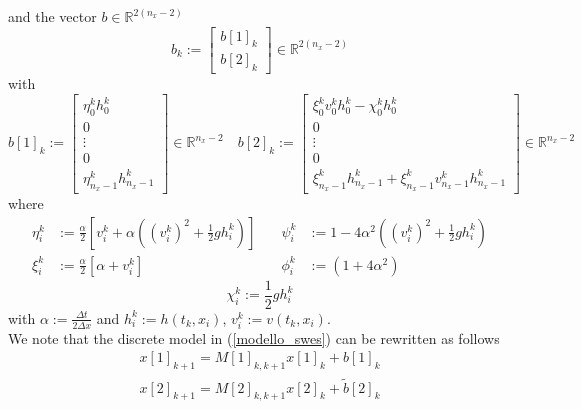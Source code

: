 \documentclass[smallcondensed]{svjour3}
\begin{document}
{and the vector $b\in \mathbb{R}^{2(n_{x}-2)}$
\begin{equation}
b_{k}:=\left[\begin{array}{ll}
b[1]_{k}\\
b[2]_{k}
\end{array}\right]\in \mathbb{R}^{2(n_{x}-2)}
\end{equation}
with 
\begin{equation}\label{b[1]}
b[1]_{k}:=\left[\begin{array}{ll}
\eta_{0}^{k}h_{0}^{k}\\
0\\
\vdots\\
0\\
\eta_{n_{x}-1}^{k}h_{n_{x}-1}^{k}
\end{array}\right]\in \mathbb{R}^{n_{x}-2} \quad 
b[2]_{k}:=\left[\begin{array}{ll}
\xi_{0}^{k}v_{0}^{k}h_{0}^{k}-\chi_{0}^{k}h_{0}^{k}\\
0\\
\vdots
\\
0
\\
\xi_{n_{x}-1}^{k}h_{n_{x}-1}^{k}+\xi_{n_{x}-1}^{k}v_{n_{x}-1}^{k}h_{n_{x}-1}^{k}
\end{array}\right]\in \mathbb{R}^{n_{x}-2} 
\end{equation}
}
\noindent where 
\begin{displaymath}
\begin{array}{lllllll}
\eta_{i}^{k}&:=\frac{\alpha}{2}[v_{i}^{k}+\alpha((v_{i}^{k})^{2}+\frac{1}{2}gh_{i}^{k})] & \quad  \psi_{i}^{k}&:=1-4\alpha^{2}((v_{i}^{k})^{2}+\frac{1}{2}gh_{i}^{k})\\
\xi_{i}^{k}&:=\frac{\alpha}{2}[\alpha + v_{i}^{k}] & \quad  \phi_{i}^{k}&:=\left(1+4\alpha^{2}\right)
\end{array}
\end{displaymath}
\begin{displaymath}
\chi_{i}^{k}:=\frac{1}{2}gh_{i}^{k}
\end{displaymath}
with $\alpha:=\frac{\Delta t}{2\Delta x}$ and $h_{i}^{k}:=h(t_{k},x_{i})$, $v_{i}^{k}:=v(t_{k},x_{i})$.\\
We note that the discrete model in (\ref{modello_swes}) can be rewritten as follows
\begin{equation}\label{1-2_model}
\begin{array}{ll}
x[1]_{k+1}={M}[1]_{k,k+1}x[1]_{k}+b[1]_{k}\\
x[2]_{k+1}={M}[2]_{k,k+1}x[2]_{k}+\tilde{b}[2]_{k}
\end{array}
\end{equation}
\end{document}
